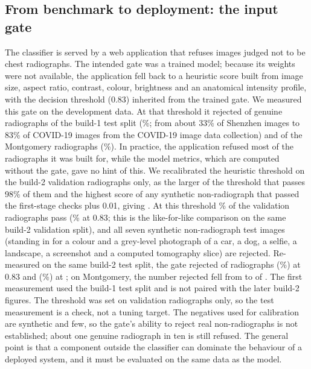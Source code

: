 \subsection{From benchmark to deployment: the input gate}
\label{sec:disc-gate}
The classifier is served by a web application that refuses images judged not to be chest radiographs. The intended gate was a trained model; because its weights were not available, the application fell back to a heuristic score built from image size, aspect ratio, contrast, colour, brightness and an anatomical intensity profile, with the decision threshold (0.83) inherited from the trained gate. We measured this gate on the development data. At that threshold it rejected \RCxrGateBOneOldTestRej{} of \RCxrGateBOneOldTestN{} genuine radiographs of the build-1 test split (\RCxrGateBOneOldTestRejPct\%; from about 33\% of Shenzhen images to 83\% of COVID-19 images from the COVID-19 image data collection) and \RCxrGateBOneOldExtRej{} of the \RCxrGateBOneOldExtN{} Montgomery radiographs (\RCxrGateBOneOldExtRejPct\%).
In practice, the application refused most of the radiographs it was built for, while the model metrics, which are computed without the gate, gave no hint of this. We recalibrated the heuristic threshold on the build-2 validation radiographs only, as the larger of the threshold that passes 98\% of them and the highest score of any synthetic non-radiograph that passed the first-stage checks plus 0.01, giving \RCxrGateNewThr. At this threshold \RCxrGateValPassNew\% of the \RCxrGateValN{} validation radiographs pass (\RCxrGateValPassOld\% at 0.83; this is the like-for-like comparison on the same build-2 validation split), and all seven synthetic non-radiograph test images (standing in for a colour and a grey-level photograph of a car, a dog, a selfie, a landscape, a screenshot and a computed tomography slice) are rejected.
Re-measured on the same build-2 test split, the gate rejected \RCxrGateBTwoOldTestRej{} of \RCxrGateBTwoOldTestN{} radiographs (\RCxrGateBTwoOldTestRejPct\%) at 0.83 and \RCxrGateBTwoNewTestRej{} (\RCxrGateBTwoNewTestRejPct\%) at \RCxrGateNewThr; on Montgomery, the number rejected fell from \RCxrGateBTwoOldExtRej{} to \RCxrGateBTwoNewExtRej{} of \RCxrGateBTwoNewExtN.
The first measurement used the build-1 test split and is not paired with the later build-2 figures. The threshold was set on validation radiographs only, so the test measurement is a check, not a tuning target. The negatives used for calibration are synthetic and few, so the gate's ability to reject real non-radiographs is not established; about one genuine radiograph in ten is still refused. The general point is that a component outside the classifier can dominate the behaviour of a deployed system, and it must be evaluated on the same data as the model.

